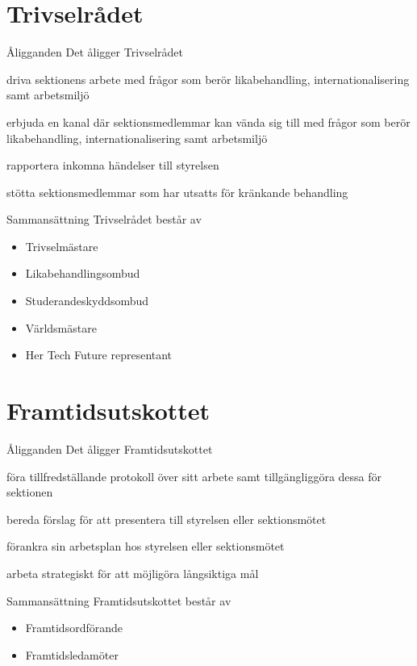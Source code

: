 \documentclass[pdfbookmarks,a4paper,11pt]{article}
\newlength{\itemcollength}
\newenvironment{reglemlista}{%
  \begin{list}{}{%
      \setlength{\labelwidth}{\itemcollength}%
      \setlength{\leftmargin}{\labelwidth + \labelsep}%
      \renewcommand{\makelabel}[1]{%
        \raisebox{0pt}[1ex][0pt]{%
          \makebox[\labelwidth][l]{%
            \parbox[t]{\itemcollength}{%
              \raggedright\hspace{0pt}##1}}}\hfill}%
      }}{%
  \end{list}}
\begin{document}
\section{Trivselrådet}

\begin{reglemlista}

	\item[Åligganden]
	Det åligger Trivselrådet
	\begin{attlista}
		\item driva sektionens arbete med frågor som berör likabehandling, internationalisering samt arbetsmiljö
		\item erbjuda en kanal där sektionsmedlemmar kan vända sig till med frågor som berör likabehandling, internationalisering samt arbetsmiljö
		\item rapportera inkomna händelser till styrelsen
		\item stötta sektionsmedlemmar som har utsatts för kränkande behandling
	\end{attlista}
	\item[Sammansättning]
	Trivselrådet består av
	\begin{itemize}
		\item Trivselmästare
		\item Likabehandlingsombud
		\item Studerandeskyddsombud
		\item Världsmästare
		\item Her Tech Future representant
	\end{itemize}

\end{reglemlista}

\section{Framtidsutskottet}

\begin{reglemlista}

	\item[Åligganden]
	Det åligger Framtidsutskottet
	\begin{attlista}
		\item föra tillfredställande protokoll över sitt arbete samt tillgängliggöra dessa för sektionen
		\item bereda förslag för att presentera till styrelsen eller sektionsmötet
		\item  förankra sin arbetsplan hos styrelsen eller sektionsmötet
		\item arbeta strategiskt för att möjligöra långsiktiga mål
	\end{attlista}
	\item[Sammansättning]
	Framtidsutskottet består av
	\begin{itemize}
		\item Framtidsordförande
		\item Framtidsledamöter
	\end{itemize}

\end{reglemlista}
\end{document}
